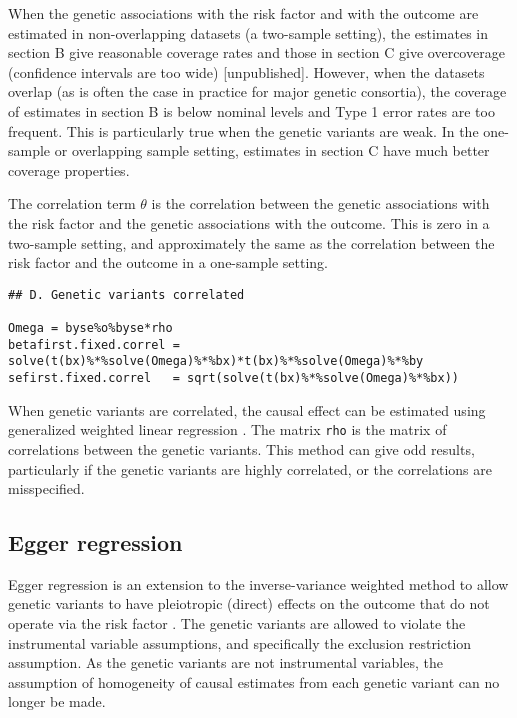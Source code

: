 \documentclass[a4paper,12pt]{article} %
\begin{document}
When the genetic associations with the risk factor and with the outcome are estimated in non-overlapping datasets (a two-sample setting), the estimates in section B give reasonable coverage rates and those in section C give overcoverage (confidence intervals are too wide) [unpublished]. However, when the datasets overlap (as is often the case in practice for major genetic consortia), the coverage of estimates in section B is below nominal levels and Type 1 error rates are too frequent. This is particularly true when the genetic variants are weak. In the one-sample or overlapping sample setting, estimates in section C have much better coverage properties.

The correlation term $\theta$ is the correlation between the genetic associations with the risk factor and the genetic associations with the outcome. This is zero in a two-sample setting, and approximately the same as the correlation between the risk factor and the outcome in a one-sample setting.

\begin{lstlisting}
## D. Genetic variants correlated

Omega = byse%o%byse*rho
betafirst.fixed.correl = solve(t(bx)%*%solve(Omega)%*%bx)*t(bx)%*%solve(Omega)%*%by
sefirst.fixed.correl   = sqrt(solve(t(bx)%*%solve(Omega)%*%bx))
\end{lstlisting}

When genetic variants are correlated, the causal effect can be estimated using generalized weighted linear regression \citep{burgess2015scoretj}. The matrix \texttt{rho} is the matrix of correlations between the genetic variants. This method can give odd results, particularly if the genetic variants are highly correlated, or the correlations are misspecified.

\clearpage

\subsection{Egger regression}
Egger regression is an extension to the inverse-variance weighted method to allow genetic variants to have pleiotropic (direct) effects on the outcome that do not operate via the risk factor \citep{bowden2015}. The genetic variants are allowed to violate the instrumental variable assumptions, and specifically the exclusion restriction assumption. As the genetic variants are not instrumental variables, the assumption of homogeneity of causal estimates from each genetic variant can no longer be made.
\end{document}
